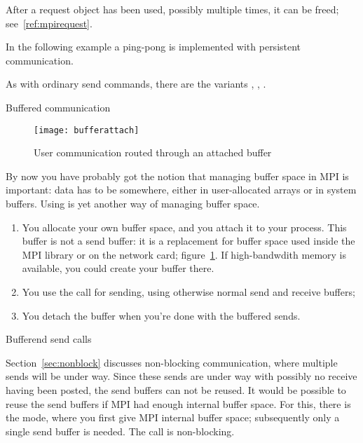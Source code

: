 After a request object has been used, possibly multiple times, it can
be freed; see~\ref{ref:mpirequest}.

In the following example a ping-pong is implemented with persistent communication.
%

As with ordinary send commands, there are the variants
,
,
.


 {Buffered communication}
\label{sec:buffered}

\begin{figure}[ht]
  \texttt{[image: bufferattach]}
  \caption{User communication routed through an attached buffer}
  \label{fig:bufattach}
\end{figure}

By now you have probably got the notion that managing buffer
space in MPI is important: data has to be somewhere, either in
user-allocated arrays or in system buffers. Using
 is yet another
way of managing buffer space.
\begin{enumerate}
\item You allocate your own buffer space, and you attach it to your
  process. This buffer is not a send buffer: it is a replacement for
  buffer space used inside the MPI library or on the network card;
  figure~\ref{fig:bufattach}. If high-bandwdith memory is available,
  you could create your buffer there.
\item You use the  call for sending, using
  otherwise normal send and receive buffers;
\item You detach the buffer when you're done with the buffered sends.
\end{enumerate}

 {Bufferend send calls}

Section~\ref{sec:nonblock} discusses non-blocking communication, where
multiple sends will be under way. Since these sends are under way with
possibly no receive having been posted, the send buffers can not be
reused. It would be possible to reuse the send buffers if MPI had
enough internal buffer space. For this, there is the
 mode, where you first give MPI internal buffer
space; subsequently only a single send buffer is needed. The
 call is non-blocking.

